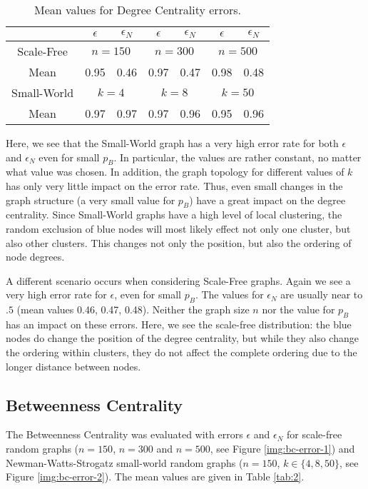 \begin{table}
\centering
\begin{tabular}{|c|c|c|c|c|c|c|}
\hline 
 & $\epsilon$ & $\epsilon_{N}$ & $\epsilon$ & $\epsilon_{N}$ & $\epsilon$ & $\epsilon_{N}$\tabularnewline
\hline 
Scale-Free & \multicolumn{2}{c|}{$n=150$} & \multicolumn{2}{c|}{$n=300$} & \multicolumn{2}{c|}{$n=500$}\tabularnewline
\hline 
Mean & 0.95 & 0.46 & 0.97 & 0.47 & 0.98 & 0.48\tabularnewline
\hline 
Small-World & \multicolumn{2}{c|}{$k=4$} & \multicolumn{2}{c|}{$k=8$} & \multicolumn{2}{c|}{$k=50$}\tabularnewline
\hline 
Mean & 0.97 & 0.97 & 0.97 & 0.96 & 0.95 & 0.96\tabularnewline
\hline 
\end{tabular}
\vspace*{.1cm}
\caption{Mean values for Degree Centrality errors.}\label{tab:1}
\end{table}
Here, we see that the Small-World graph has a very high error rate for both $\epsilon$ and $\epsilon_N$ even for small $p_B$. In particular, the values are rather constant, no matter what value was chosen. In addition, the graph topology for different values of $k$ has only very little impact on the error rate. Thus, even small changes in the graph structure (a very small value for $p_B$) have a great impact on the degree centrality. Since Small-World graphs have a high level of local clustering, the random exclusion of blue nodes will most likely effect not only one cluster, but also other clusters. This changes not only the position, but also the ordering of node degrees. 

A different scenario occurs when considering Scale-Free graphs. Again we see a very high error rate for $\epsilon$, even for small $p_B$. The values for $\epsilon_N$ are usually near to $.5$ (mean values 0.46, 0.47, 0.48). Neither the graph size $n$ nor the value for $p_B$ has an impact on these errors. Here, we see the scale-free distribution: the blue nodes do change the position of the degree centrality, but while they also change the ordering within clusters, they do not affect the complete ordering due to the longer distance between nodes.

\subsection{Betweenness Centrality}

The Betweenness Centrality was evaluated with errors $\epsilon$ and $\epsilon_N$ for scale-free random graphs ($n=150$, $n=300$ and $n=500$, see Figure \ref{img:bc-error-1}) and Newman-Watts-Strogatz small-world random graphs ($n=150$, $k\in\{4,8,50\}$, see Figure \ref{img:bc-error-2}). The mean values are given in Table \ref{tab:2}.

